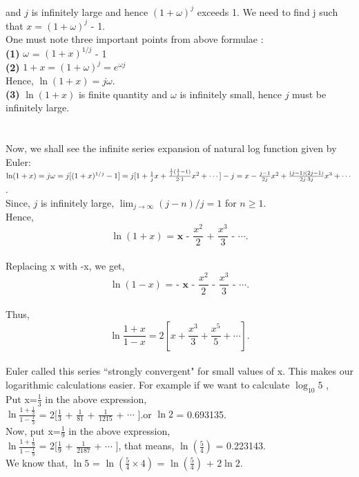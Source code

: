 \documentclass[a4paper,11pt]{article}
\begin{document}
and $j$ is infinitely large and hence  $( 1 + \omega)^j$ exceeds 1.
We need to find j such that $x = ( 1 + \omega)^j$ - 1.\\
One must note three important points from above formulae :\\
\textbf{(1)} $\omega$ = $(1 + x)^{1/j}$ - 1 \\
\textbf{(2)}  $1 + x =  (1 + \omega)^j = e^{\omega j} $\\
Hence, $\ln(1 + x) = j\omega$.\\
\textbf{(3)}  $\ln(1 + x)$ is finite quantity and $\omega$ is infinitely small, hence $j$ must be 
infinitely large. \\
\\
\\
Now, we shall see the infinite series expansion of natural log function given by Euler:\\
$\ln(1 + x) = j\omega = j [(1 + x)^{1/j} - 1] = j[ 1 + \frac{1}{j}x + \frac{\frac{1}{j}(\frac{1}{j}-1)}{2\cdot1}x^2 + \cdots] - j\\
= x - \frac{j-1}{2j}x^2 + \frac{(j-1)(2j-1)}{2j\cdot3j}x^3 + \cdots$.\\
Since, $j$ is infinitely large, $ \lim_{j\to\infty}(j-n)/j = 1$ for $n\geq1.$\\ 
\noindent Hence,\\
$$\textbf{$\ln(1+x)$ =  x - $\frac{x^2}{2}$ + $\frac{x^3}{3}$ - $\cdots$.}$$\\
Replacing x with -x, we get,
$$\textbf{$\ln(1-x)$ = - x - $\frac{x^2}{2}$ - $\frac{x^3}{3}$ - $\cdots$.}$$\\
Thus,\\
$$ \ln\frac{1+x}{1-x} = 2[ x + \frac{x^3}{3} + \frac{x^5}{5} + \cdots].$$
\\
Euler called this series ``strongly convergent" for small values of x.
This makes our logarithmic calculations easier. For example if we want to calculate $\log_{10}5$ , \\
Put x=$\frac{1}{3}$ in the above expression,\\
$\ln\frac{1+\frac{1}{3}}{1-\frac{1}{3}}$ = 2[$\frac{1}{3}$ + $\frac{1}{81}$ + $\frac{1}{1215}$ + $\cdots$ ].or $\ln2$ = 0.693135.\\
Now, put  x=$\frac{1}{9}$ in the above expression,\\
$\ln\frac{1+\frac{1}{9}}{1-\frac{1}{9}}$ = 2[$\frac{1}{9}$ + $\frac{1}{2187}$ + $\cdots$ ], that means, $\ln(\frac{5}{4})$ = 0.223143.\\
We know that, $\ln5$ = $\ln(\frac{5}{4}\times4)$ = $\ln(\frac{5}{4})$ + 2$\ln2$.\\
\end{document}
